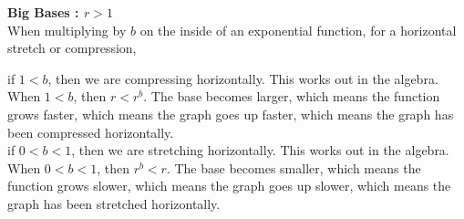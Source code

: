 \documentclass{ximera}
\begin{document}
\begin{observation} \textbf{\textcolor{blue!55!black}{Big Bases : $r > 1$}}     \\



When multiplying by $b$ on the inside of an exponential function, for a horizontal stretch or compression, 


if $1 < b$, then we are compressing horizontally.  This works out in the algebra. When $1 < b$, then $r < r^b$. The base becomes larger, which means the function grows faster, which means the graph goes up faster, which means the graph has been compressed horizontally. \\



if $0 < b < 1$, then we are stretching horizontally.  This works out in the algebra. When $0 < b < 1$, then $r^b < r$. The base becomes smaller, which means the function grows slower, which means the graph goes up slower, which means the graph has been stretched horizontally.


\end{observation}
\end{document}
